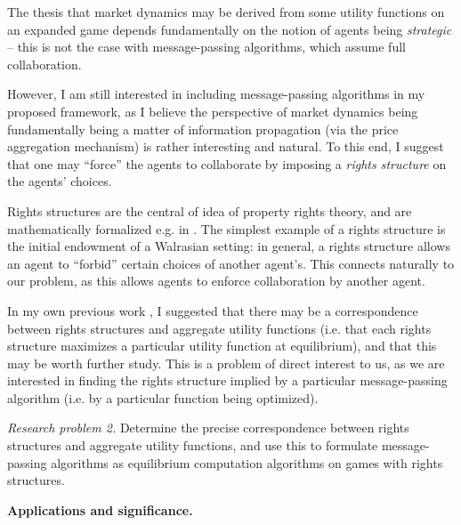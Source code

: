 \documentclass{article}
\newcommand{\statement}[1]{\par\medskip
  {\textbf{#1.}}\space
}
\newcommand{\substatement}[1]{\par\medskip
  {\emph{#1.}}\space
}
\begin{document}
The thesis that market dynamics may be derived from some utility functions on an expanded game depends fundamentally on the notion of agents being \emph{strategic} -- this is not the case with message-passing algorithms, which assume full collaboration. 

However, I am still interested in including message-passing algorithms in my proposed framework, as I believe the perspective of market dynamics being fundamentally being a matter of information propagation (via the price aggregation mechanism) is rather interesting and natural. To this end, I suggest that one may ``force'' the agents to collaborate by imposing a \emph{rights structure} on the agents' choices.

Rights structures are the central of idea of property rights theory, and are mathematically formalized e.g. in \cite{garden, pasu}. The simplest example of a rights structure is the initial endowment of a Walrasian setting: in general, a rights structure allows an agent to ``forbid'' certain choices of another agent's. This connects naturally to our problem, as this allows agents to enforce collaboration by another agent.

In my own previous work \cite{pasu}, I suggested that there may be a correspondence between rights structures and aggregate utility functions (i.e. that each rights structure maximizes a particular utility function at equilibrium), and that this may be worth further study. This is a problem of direct interest to us, as we are interested in finding the rights structure implied by a particular message-passing algorithm (i.e. by a particular function being optimized).

\substatement{Research problem 2} Determine the precise correspondence between rights structures and aggregate utility functions, and use this to formulate message-passing algorithms as equilibrium computation algorithms on games with rights structures.

\statement{Applications and significance}

\end{document}
